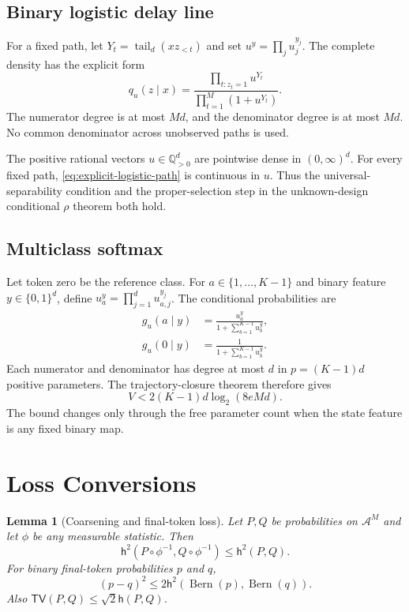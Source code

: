 \documentclass[twoside]{article}
\newtheorem{lemma}[theorem]{Lemma}
\newcommand{\A}{\mathcal A}
\newcommand{\h}{\mathsf h}
\newcommand{\TV}{\mathsf{TV}}
\begin{document}
\subsection{Binary logistic delay line}

For a fixed path, let $Y_t=\operatorname{tail}_d(xz_{<t})$ and set $u^y=\prod_ju_j^{y_j}$. The complete density has the explicit form
\begin{equation}
 q_u(z\mid x)=
 \frac{\prod_{t:z_t=1}u^{Y_t}}
 {\prod_{t=1}^M(1+u^{Y_t})}.
 \label{eq:explicit-logistic-path}
\end{equation}
The numerator degree is at most $Md$, and the denominator degree is at most $Md$. No common denominator across unobserved paths is used.

The positive rational vectors $u\in\mathbb Q_{>0}^d$ are pointwise dense in $(0,\infty)^d$. For every fixed path, \eqref{eq:explicit-logistic-path} is continuous in $u$. Thus the universal-separability condition and the proper-selection step in the unknown-design conditional $\rho$ theorem both hold.

\subsection{Multiclass softmax}

Let token zero be the reference class. For $a\in\{1,\ldots,K-1\}$ and binary feature $y\in\{0,1\}^d$, define $u_a^y=\prod_{j=1}^du_{a,j}^{y_j}$. The conditional probabilities are
\begin{align*}
 g_u(a\mid y)&=\frac{u_a^y}{1+\sum_{b=1}^{K-1}u_b^y},\\
 g_u(0\mid y)&=\frac1{1+\sum_{b=1}^{K-1}u_b^y}.
\end{align*}
Each numerator and denominator has degree at most $d$ in $p=(K-1)d$ positive parameters. The trajectory-closure theorem therefore gives
\[
 V<2(K-1)d\log_2(8eMd).
\]
The bound changes only through the free parameter count when the state feature is any fixed binary map.

\section{Loss Conversions}
\label{app:loss}

\begin{lemma}[Coarsening and final-token loss]
\label{lem:coarsening}
Let $P,Q$ be probabilities on $\A^M$ and let $\phi$ be any measurable statistic. Then
\[
 \h^2(P\circ\phi^{-1},Q\circ\phi^{-1})\leq\h^2(P,Q).
\]
For binary final-token probabilities $p$ and $q$,
\[
 (p-q)^2\leq2\h^2(\operatorname{Bern}(p),\operatorname{Bern}(q)).
\]
Also $\TV(P,Q)\leq\sqrt2\h(P,Q)$.
\end{lemma}
\end{document}
